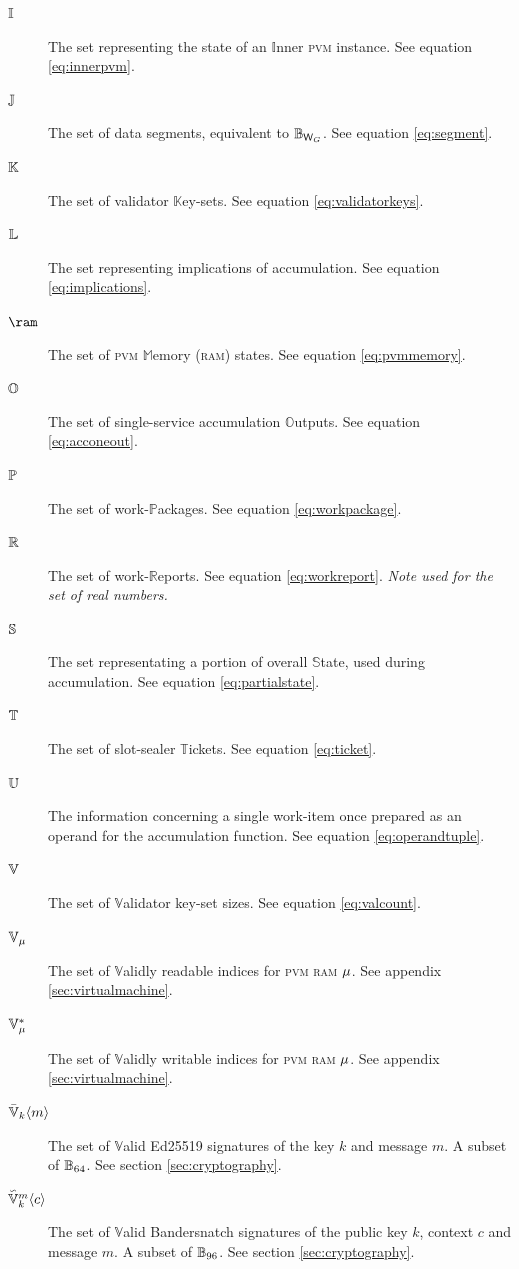 \begin{description}
  \item[$\innerpvm$] The set representing the state of an $\mathbb{I}$nner \textsc{pvm} instance. See equation \ref{eq:innerpvm}.
  \item[$\segment$] The set of data segments, equivalent to $\blob[\Csegmentsize]$. See equation \ref{eq:segment}.
  \item[$\valkey$] The set of validator $\mathbb{K}$ey-sets. See equation \ref{eq:validatorkeys}.
  \item[$\implications$] The set representing implications of accumulation. See equation \ref{eq:implications}.
  \item[$\ram$] The set of \textsc{pvm} $\mathbb{M}$emory (\textsc{ram}) states. See equation \ref{eq:pvmmemory}.
  \item[$\acconeout$] The set of single-service accumulation $\mathbb{O}$utputs. See equation \ref{eq:acconeout}.
  \item[$\workpackage$] The set of work-$\mathbb{P}$ackages. See equation \ref{eq:workpackage}.
  \item[$\workreport$] The set of work-$\mathbb{R}$eports. See equation \ref{eq:workreport}. \emph{Note used for the set of real numbers.}
  \item[$\partialstate$] The set representating a portion of overall $\mathbb{S}$tate, used during accumulation. See equation \ref{eq:partialstate}.
  \item[$\safroleticket$] The set of slot-sealer $\mathbb{T}$ickets. See equation \ref{eq:ticket}.
  \item[$\operandtuple$] The information concerning a single work-item once prepared as an operand for the accumulation function. See equation \ref{eq:operandtuple}.
  \item[$\valcount$] The set of $\mathbb{V}$alidator key-set sizes. See equation \ref{eq:valcount}.
  \item[$\readable{\memory}$] The set of $\mathbb{V}$alidly readable indices for \textsc{pvm} \textsc{ram} $\memory$. See appendix \ref{sec:virtualmachine}.
  \item[$\writable{\memory}$] The set of $\mathbb{V}$alidly writable indices for \textsc{pvm} \textsc{ram} $\memory$. See appendix \ref{sec:virtualmachine}.
  \item[$\edsignature{k}{m}$] The set of $\mathbb{V}$alid Ed25519 signatures of the key $k$ and message $m$. A subset of $\blob[64]$. See section \ref{sec:cryptography}.
  \item[$\bssignature{k}{c}{m}$] The set of $\mathbb{V}$alid Bandersnatch signatures of the public key $k$, context $c$ and message $m$. A subset of $\blob[96]$. See section \ref{sec:cryptography}.

\end{description}
